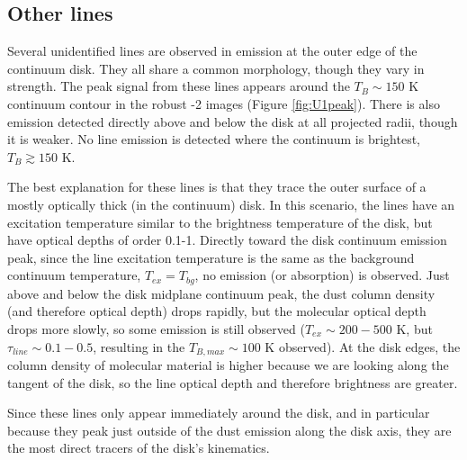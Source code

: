 \documentclass[twocolumn]{aastex61}
\begin{document}
\subsection{Other lines}
\label{sec:otherlines}
Several unidentified lines are observed in  emission at the outer edge of the
continuum disk.  They all share a common morphology, though they vary in
strength.
The peak signal from these lines appears around the $T_B\sim150$ K continuum contour
in the robust -2 images
(Figure \ref{fig:U1peak}).
There is also emission detected directly above and below the disk at all projected
radii, though it is weaker.  No line emission is detected where the continuum is
brightest, $T_B\gtrsim150$ K.

The best explanation for these lines is that they trace the outer surface of a
mostly optically thick (in the continuum) disk.  In this scenario,
the lines have an excitation temperature similar to the brightness temperature
of the disk, but have optical depths of order 0.1-1.  
Directly toward the disk
continuum emission peak, since
the line excitation temperature is the same as the background continuum temperature,
$T_{ex}=T_{bg}$, no emission (or absorption) is observed.  Just above and below
the disk midplane continuum peak, the dust column density (and therefore
optical depth) drops rapidly, but the molecular optical depth drops more
slowly, so some emission is still
observed ($T_{ex}\sim200-500$ K, but $\tau_{line}\sim0.1-0.5$, resulting in 
the $T_{B,max} \sim 100$ K observed).  At the disk edges, the column density of
molecular material is higher because we are looking along the tangent of the
disk, so the line optical depth and therefore brightness are greater.

Since these lines only appear immediately around the disk, and in particular
because they peak just outside of the dust emission along the disk axis, they
are the most direct tracers of the disk's kinematics.

\end{document}

